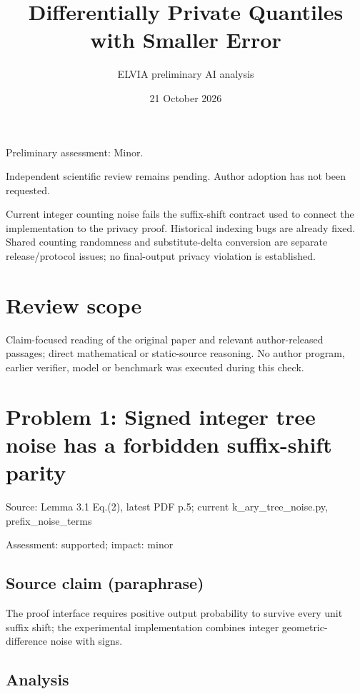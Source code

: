 \documentclass[11pt]{article}
\begin{document}
\title{Differentially Private Quantiles with Smaller Error}

\author{ELVIA preliminary AI analysis}\date{21 October 2026}\maketitle

Preliminary assessment: Minor.\par

Independent scientific review remains pending. Author adoption has not been requested.

Current integer counting noise fails the suffix-shift contract used to connect the implementation to the privacy proof. Historical indexing bugs are already fixed. Shared counting randomness and substitute-delta conversion are separate release/protocol issues; no final-output privacy violation is established.

\section*{Review scope}

Claim-focused reading of the original paper and relevant author-released passages; direct mathematical or static-source reasoning. No author program, earlier verifier, model or benchmark was executed during this check.

\section*{Problem 1: Signed integer tree noise has a forbidden suffix-shift parity}

Source: Lemma 3.1 Eq.(2), latest PDF p.5; current k\_ary\_tree\_noise.py, prefix\_noise\_terms

Assessment: supported; impact: minor

\subsection*{Source claim (paraphrase)}

The proof interface requires positive output probability to survive every unit suffix shift; the experimental implementation combines integer geometric-difference noise with signs.

\subsection*{Analysis}
\end{document}
